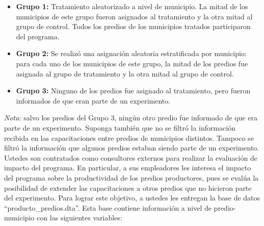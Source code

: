 \documentclass[a4paper]{article}
\begin{document}
\begin{itemize}
    \item \textbf{Grupo 1:} Tratamiento aleatorizado a nivel de municipio. La mitad de los municipios  de este grupo fueron asignados al tratamiento y la otra mitad al grupo de control. Todos los predios de los municipios tratados participaron del programa.
    
    \item \textbf{Grupo 2:}
    Se realizó una asignación aleatoria estratificada por municipio: para cada uno de los municipios de este grupo, la mitad de los predios fue asignada al grupo de tratamiento y la otra mitad al grupo de control.
    
    \item \textbf{Grupo 3:} Ninguno de los predios fue asignado al tratamiento, pero fueron informados de que eran parte de un experimento.
\end{itemize}

\textit{Nota:} salvo los predios del Grupo 3, ningún otro predio fue informado de que era parte de un experimento. Suponga también que no se filtró la información recibida en las capacitaciones entre predios de municipios distintos. Tampoco se filtró la información que algunos predios estaban siendo parte de un experimento. \\ 

Ustedes son contratados como consultores externos para realizar la evaluación de impacto del programa. En particular, a sus empleadores les interesa el impacto del programa sobre la productividad de los predios productores, pues se evalúa la posibilidad de extender las capacitaciones a otros predios que no hicieron parte del experimento. Para lograr este objetivo, a ustedes les entregan la base de datos ``producto\_predios.dta''. Esta base contiene información a nivel de predio-municipio con las siguientes variables:
\end{document}

